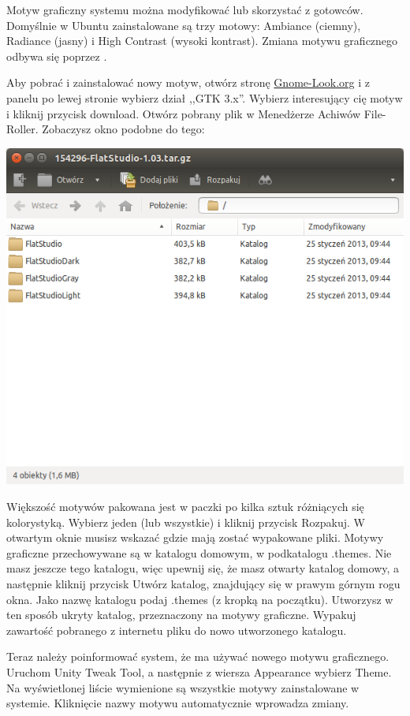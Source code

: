 Motyw graficzny systemu można modyfikować lub skorzystać z gotowców. Domyślnie w Ubuntu zainstalowane są trzy motowy: Ambiance (ciemny), Radiance (jasny) i High Contrast (wysoki kontrast). Zmiana motywu graficznego odbywa się poprzez .

Aby pobrać i zainstalować nowy motyw, otwórz stronę \href{http://gnome-look.org/}{Gnome-Look.org} i z panelu po lewej stronie wybierz dział ,,GTK 3.x''. Wybierz interesujący cię motyw i kliknij przycisk \textcolor{ubuntu_orange}{download}. Otwórz pobrany plik w Menedżerze Achiwów File-Roller. Zobaczysz okno podobne do tego:
\begin{center}
\includegraphics[width=\linewidth]{images/programy_fileRoller.png}
\end{center}
Większość motywów pakowana jest w paczki po kilka sztuk różniących się kolorystyką. Wybierz jeden (lub wszystkie) i kliknij przycisk \textcolor{ubuntu_orange}{Rozpakuj}. W otwartym oknie musisz wskazać gdzie mają zostać wypakowane pliki. Motywy graficzne przechowywane są w katalogu domowym, w podkatalogu .themes. Nie masz jeszcze tego katalogu, więc upewnij się, że masz otwarty katalog domowy, a następnie kliknij przycisk \textcolor{ubuntu_orange}{Utwórz katalog}, znajdujący się w prawym górnym rogu okna. Jako nazwę katalogu podaj .themes (z kropką na początku). Utworzysz w ten sposób ukryty katalog, przeznaczony na motywy graficzne. Wypakuj zawartość pobranego z internetu pliku do nowo utworzonego katalogu.

Teraz należy poinformować system, że ma używać nowego motywu graficznego. Uruchom \textcolor{ubuntu_orange}{Unity Tweak Tool}, a następnie z wiersza \textcolor{ubuntu_orange}{Appearance} wybierz \textcolor{ubuntu_orange}{Theme}. Na wyświetlonej liście wymienione są wszystkie motywy zainstalowane w systemie. Kliknięcie nazwy motywu automatycznie wprowadza zmiany.
